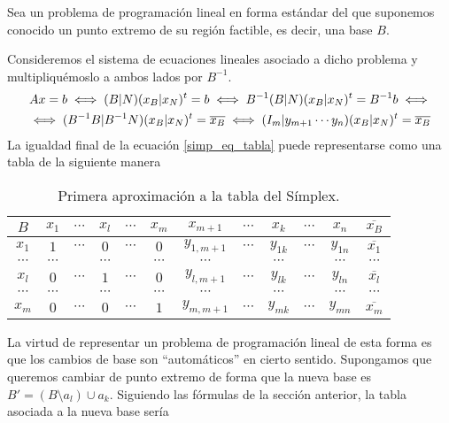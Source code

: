Sea un problema de programación lineal en forma estándar del que suponemos conocido un punto extremo de su región factible, es decir, una base $B$.

Consideremos el sistema de ecuaciones lineales asociado a dicho problema y multipliquémoslo a ambos lados por $B^{-1}$.
\begin{multline}
	\label{simp_eq_tabla}
	Ax=b\iff (B|N)(x_B|x_N)^t=b\iff B^{-1}(B|N)(x_B|x_N)^t=B^{-1}b\iff\\
	\iff (B^{-1}B|B^{-1}N)(x_B|x_N)^t=\overline{x_B}\iff (I_m|y_{m+1}\cdots y_n)(x_B|x_N)^t=\overline{x_B}
\end{multline}
La igualdad final de la ecuación \eqref{simp_eq_tabla} puede representarse como una tabla de la siguiente manera
\begin{table}[H]
	\centering
	\begin{tabular}{c|cccccccccc|c}
		$B$      & $x_1$    & $\cdots$ & $x_l$    & $\cdots$ & $x_m$    & $x_{m+1}$   & $\cdots$ & $x_k$    & $\cdots$ & $x_n$    & $\overline{x_B}$ \\ \hline
		$x_1$    & $1$      & $\cdots$ & $0$      & $\cdots$ & $0$      & $y_{1,m+1}$ & $\cdots$ & $y_{1k}$ & $\cdots$ & $y_{1n}$ & $\overline{x_1}$ \\
		$\cdots$ & $\cdots$ &          & $\cdots$ &          & $\cdots$ & $\cdots$    &          & $\cdots$ &          & $\cdots$ & $\cdots$         \\
		$x_l$    & $0$      & $\cdots$ & $1$      & $\cdots$ & $0$      & $y_{l,m+1}$ & $\cdots$ & $y_{lk}$ & $\cdots$ & $y_{ln}$ & $\overline{x_l}$ \\
		$\cdots$ & $\cdots$ &          & $\cdots$ &          & $\cdots$ & $\cdots$    &          & $\cdots$ &          & $\cdots$ & $\cdots$         \\
		$x_m$    & $0$      & $\cdots$ & $0$      & $\cdots$ & $1$      & $y_{m,m+1}$ & $\cdots$ & $y_{mk}$ & $\cdots$ & $y_{mn}$ & $\overline{x_m}$ \\ \hline
	\end{tabular}
	\label{simp_tab_simplex1}
	\caption{Primera aproximación a la tabla del Símplex.}
\end{table}
La virtud de representar un problema de programación lineal de esta forma es que los cambios de base son ``automáticos'' en cierto sentido. Supongamos que queremos cambiar de punto extremo de forma que la nueva base es $B'=(B\setminus a_l)\cup a_k$. Siguiendo las fórmulas de la sección anterior, la tabla asociada a la nueva base sería

